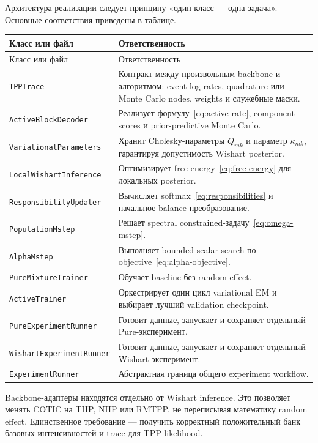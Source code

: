 \documentclass[12pt,a4paper]{article}
\newcommand{\code}[1]{\texttt{#1}}
\begin{document}
Архитектура реализации следует принципу «один класс --- одна задача». Основные соответствия приведены в таблице.

\begin{longtable}{@{}p{}p{}@{}}
\toprule
Класс или файл & Ответственность \\
\midrule
\endfirsthead
\toprule
Класс или файл & Ответственность \\
\midrule
\endhead
\code{TPPTrace} & Контракт между произвольным backbone и алгоритмом: event log-rates, quadrature или Monte Carlo nodes, weights и служебные маски. \\
\code{ActiveBlockDecoder} & Реализует формулу~\eqref{eq:active-rate}, component scores и prior-predictive Monte Carlo. \\
\code{VariationalParameters} & Хранит Cholesky-параметры \(Q_{mk}\) и параметр \(\kappa_{mk}\), гарантируя допустимость Wishart posterior. \\
\code{LocalWishartInference} & Оптимизирует free energy~\eqref{eq:free-energy} для локальных posterior. \\
\code{ResponsibilityUpdater} & Вычисляет softmax~\eqref{eq:responsibilities} и начальное balance-преобразование. \\
\code{PopulationMstep} & Решает spectral constrained-задачу~\eqref{eq:omega-mstep}. \\
\code{AlphaMstep} & Выполняет bounded scalar search по objective~\eqref{eq:alpha-objective}. \\
\code{PureMixtureTrainer} & Обучает baseline без random effect. \\
\code{ActiveTrainer} & Оркестрирует один цикл variational EM и выбирает лучший validation checkpoint. \\
\code{PureExperimentRunner} & Готовит данные, запускает и сохраняет отдельный Pure-эксперимент. \\
\code{WishartExperimentRunner} & Готовит данные, запускает и сохраняет отдельный Wishart-эксперимент. \\
\code{ExperimentRunner} & Абстрактная граница общего experiment workflow. \\
\bottomrule
\end{longtable}

Backbone-адаптеры находятся отдельно от Wishart inference. Это позволяет менять COTIC на THP, NHP или RMTPP, не переписывая математику random effect. Единственное требование --- получить корректный положительный банк базовых интенсивностей и trace для TPP likelihood.
\end{document}
